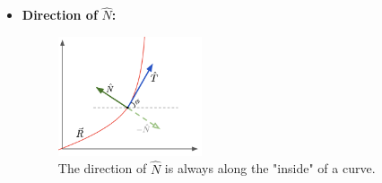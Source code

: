 \documentclass[12pt]{article}
\begin{document}
{\begin{itemize}
Rewriting this more generally, we have \[\kappa = \frac{||\deriv{\vec{R}}{t} \times \sderiv{\vec{R}}{t}||}{||\deriv{R}{t}||^3}\]

From here, we can consider a number of special cases:

\begin{itemize}
    \item \textbf{Planar Curves}; ie, no movement in $\vu{k}$. We thus have $\vec{R}(t) = x(t) \vu{i} + y(t) \vu{j}$ (and natural higher-order derivatives). It follows naturally that: \[\kappa = \frac{|\dot{x}\ddot{y}-\dot{y}\ddot{x}|}{(\dot{x}^2+\dot{y}^2)^{3/2}}\]
    Consider a circle, for instance, of $x = h + a \cos t$, $y = k + a \sin t$. The curvature would be give \begin{align*}
        \kappa &= \frac{|(-a \sin t)(-a \sin t) - (a\cos t)(-a\cos t)|}{(a^2 \sin^2 t + a^2 \cos^2 t)^{3/2}}\\
        &= \cdots = \frac{1}{a}
    \end{align*}
    It follows that $\rho = a$, ie the radius of curvature of a circle is its radius.
    \item \textbf{Function of $x$}; say we have $y = f(x)$. We can parametrize this curve as $x = t$, $y = f(t)$, and compute the curvature: \begin{align*}
        \kappa &= \frac{|f''(t) - 0|}{(1 + f'(t)^2)^{3/2}}\\
        &= \frac{\sderiv{y}{x}}{(1+\left(\deriv{y}{x}\right)^2)^{3/2}}\\
    \end{align*}
    i.e., the curvature in "Cartesian form".
\end{itemize}

\item \textbf{Direction of }$\hat{N}$\textbf{:}

\begin{figure}[!ht]
    \centering
    \includegraphics[width=0.4\textwidth]{./misc/directionofn.png}
    \caption{The direction of $\hat{N}$ is always along the "inside" of a curve.}
    \label{fig:normal_direction}
\end{figure}


\end{itemize}}
\end{document}
